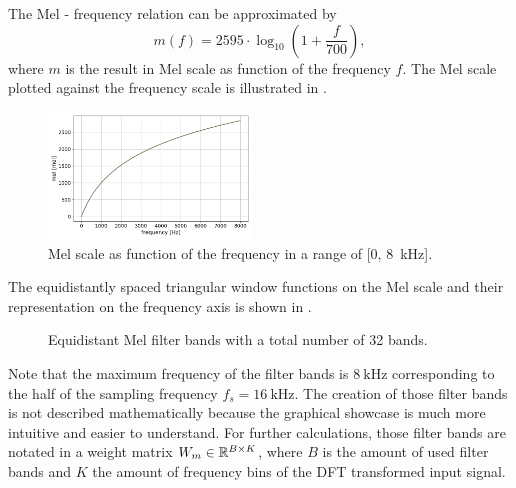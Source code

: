 The Mel - frequency relation can be approximated by
\begin{equation}\label{eq:signal_mfcc_mel}
  m(f) = 2595 \cdot \log_{10} \left(1 + \frac{f}{700} \right),
\end{equation}
where $m$ is the result in Mel scale as function of the frequency $f$.
The Mel scale plotted against the frequency scale is illustrated in .
\begin{figure}[!ht]
  \centering
  \includegraphics[width=0.48\textwidth]{./3_signal/figs/signal_mfcc_mel_scale.png}
  \caption{Mel scale as function of the frequency in a range of [0, \SI{8}{\kilo\hertz}].}
  \label{fig:signal_mfcc_mel_scale}
\end{figure}
\FloatBarrier
\noindent
The equidistantly spaced triangular window functions on the Mel scale and their representation on the frequency axis is shown in .
\begin{figure}[!ht]
  \centering
  \quad
  \caption{Equidistant Mel filter bands with a total number of 32 bands.}
  \label{fig:filter_bands}
\end{figure}
\FloatBarrier
\noindent
Note that the maximum frequency of the filter bands is $\SI{8}{\kilo\hertz}$ corresponding to the half of the sampling frequency $f_s = \SI{16}{\kilo\hertz}$.
The creation of those filter bands is not described mathematically because the graphical showcase is much more intuitive and easier to understand.
For further calculations, those filter bands are notated in a weight matrix $W_m \in \mathbb{R}^{B \times K}$, where $B$ is the amount of used filter bands and $K$ the amount of frequency bins of the DFT transformed input signal.

